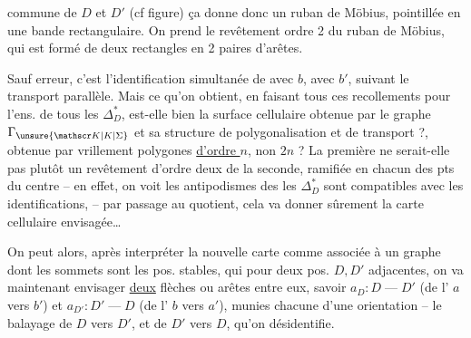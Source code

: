 
commune de $D$ et $D'$ (cf figure) ça donne donc un ruban de Möbius,   pointillée en une bande rectangulaire. On prend le revêtement  ordre 2 du ruban de Möbius,  qui est formé de deux rectangles  en 2 paires d'arêtes.

Sauf erreur, c'est l'identification  simultanée de  avec $b$,   avec $b'$, suivant le transport parallèle. Mais ce qu'on obtient, en faisant tous ces recollements pour l'ens. de tous les $\Delta_D^*$, est-elle bien la surface cellulaire obtenue par le graphe $\Gamma_{\unsure{\mathscr K|K|\Sigma}}$ et sa structure de polygonalisation et de transport ?, obtenue
par vrillement \uline{} polygones \uline{d'ordre $n$}, non $2n$ ?  La première ne serait-elle pas plutôt un revêtement d'ordre deux de la seconde, ramifiée en chacun des pts du centre -- en effet, on voit   les antipodismes des les $\Delta_D^*$ sont compatibles avec les identifications, -- par passage au quotient, cela va donner sûrement la carte cellulaire envisagée\ldots{}

On peut alors,  après  interpréter la nouvelle carte comme associée à un graphe  dont les sommets sont les pos. stables, qui pour deux pos. $D,D'$ adjacentes, on va maintenant envisager \uline{deux} flèches ou arêtes entre eux, savoir $a_D:D\mathbin{\text{---}}D'$ (de l' $a$ vers $b'$) et $a_{D'}:D'\mathbin{\text{---}}D$ (de l' $b$ vers $a'$), munies chacune d'une orientation -- le balayage de $D$ vers $D'$, et de $D'$ vers $D$, qu'on désidentifie.

